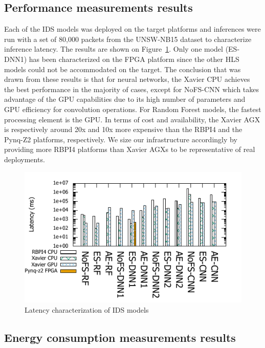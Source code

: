 \subsection{Performance measurements results}

Each of the IDS models was deployed on the target platforms and inferences were run with a set of 80,000 packets from the UNSW-NB15 dataset to characterize inference latency. The results are shown on Figure~\ref{figure:herocache-performance}. Only one model (ES-DNN1) has been characterized on the FPGA platform since the other HLS models could not be accommodated on the target. %
The conclusion that was drawn from these results is that for neural networks, the Xavier CPU achieves the best performance in the majority of cases, except for NoFS-CNN which takes advantage of the GPU capabilities due to its high number of parameters and GPU efficiency for convolution operations. For Random Forest models, the fastest processing element is the GPU. In terms of cost and availability, the Xavier AGX is respectively around 20x and 10x more expensive than the RBPI4 and the Pynq-Z2 platforms, respectively. We size our infrastructure accordingly by providing more RBPI4 platforms than Xavier AGXs to be  representative of real deployments. %

\begin{figure}
    \centering
    \includegraphics[width=0.9\columnwidth]{6_Chapitre4/figures/latency_bar.pdf}
    \caption{Latency characterization of IDS models}
    \label{figure:herocache-performance}
\end{figure}

\subsection{Energy consumption measurements results}

